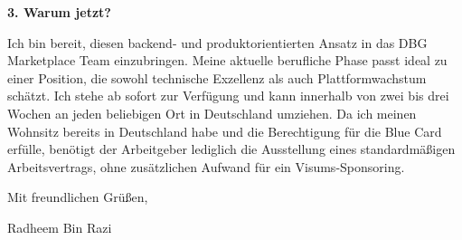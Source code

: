 \documentclass[11pt,a4paper]{coverletter}
\begin{document}
\vspace{8pt}\noindent\textbf{3. Warum jetzt?}\par\vspace{3pt}

Ich bin bereit, diesen backend- und produktorientierten Ansatz in das DBG Marketplace Team einzubringen. Meine aktuelle berufliche Phase passt ideal zu einer Position, die sowohl technische Exzellenz als auch Plattformwachstum schätzt. Ich stehe ab sofort zur Verfügung und kann innerhalb von zwei bis drei Wochen an jeden beliebigen Ort in Deutschland umziehen. Da ich meinen Wohnsitz bereits in Deutschland habe und die Berechtigung für die Blue Card erfülle, benötigt der Arbeitgeber lediglich die Ausstellung eines standardmäßigen Arbeitsvertrags, ohne zusätzlichen Aufwand für ein Visums-Sponsoring.

\closing{Mit freundlichen Grüßen,}{Radheem Bin Razi}
\end{document}
